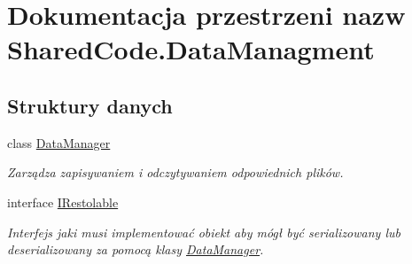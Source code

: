 \hypertarget{a00307}{}\section{Dokumentacja przestrzeni nazw Shared\+Code.\+Data\+Managment}
\label{a00307}
\subsection*{Struktury danych}
\begin{DoxyCompactItemize}
\item 
class \hyperlink{a00017}{Data\+Manager}
\begin{DoxyCompactList}\small\item\em Zarządza zapisywaniem i odczytywaniem odpowiednich plików. \end{DoxyCompactList}\item 
interface \hyperlink{a00031}{I\+Restolable}
\begin{DoxyCompactList}\small\item\em Interfejs jaki musi implementować obiekt aby mógł być serializowany lub deserializowany za pomocą klasy \hyperlink{a00017}{Data\+Manager}. \end{DoxyCompactList}\end{DoxyCompactItemize}
